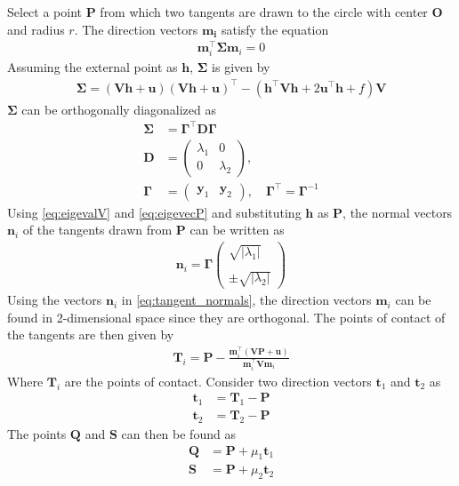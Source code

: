 \documentclass[journal,10pt,twocolumn]{article}
\providecommand{\abs}[1]{\left\vert#1\right\vert}
\let\vec\mathbf
\newcommand{\myvec}[1]{\ensuremath{\begin{pmatrix}#1\end{pmatrix}}}
\providecommand{\brak}[1]{\ensuremath{\left(#1\right)}}
\begin{document}
Select a point $\vec{P}$ from which two tangents are drawn to the circle with center $\vec{O}$ and radius $r$. The direction vectors $\vec{m_i}$ satisfy the equation
\begin{align}
	\vec{m}_i^\top\vec{\Sigma}\vec{m}_i = 0
\end{align}
Assuming the external point as $\vec{h}$, $\vec{\Sigma}$ is given by
\begin{align}
	\label{eq:Sigma}
	\vec{\Sigma} = \brak{\vec{Vh}+\vec{u}}\brak{\vec{Vh}+\vec{u}}^\top - \brak{\vec{h}^\top\vec{V}\vec{h} + 2\vec{u}^\top\vec{h} + f}\vec{V}
\end{align}
$\vec{\Sigma}$ can be orthogonally diagonalized as
\begin{align}
	\label{eq:Sigma_diag}
	\vec{\Sigma} &= \vec{\Gamma}^\top\vec{D}\vec{\Gamma}\\
	\label{eq:eigevalV}
	\vec{D} &= \myvec{\lambda_1 & 0\\ 0 & \lambda_2}, \\
	\label{eq:eigevecP}
	\vec{\Gamma} &= \myvec{\vec{y}_1 & \vec{y}_2}, \quad \vec{\Gamma}^{\top}=\vec{\Gamma}^{-1}
\end{align}
Using \eqref{eq:eigevalV} and \eqref{eq:eigevecP} and substituting $\vec{h}$ as $\vec{P}$, the normal vectors $\vec{n}_i$ of the tangents drawn from $\vec{P}$ can be written as
\begin{align}
	\label{eq:tangent_normals}
	\vec{n}_i = \vec{\Gamma}\myvec{\sqrt{\abs{\lambda_1}} \\\\ \pm\sqrt{\abs{\lambda_2}}}
\end{align}
Using the vectors $\vec{n}_i$ in \eqref{eq:tangent_normals}, the direction vectors $\vec{m}_i$ can be found in 2-dimensional space since they are orthogonal. The points of contact of the tangents are then given by
\begin{align}
	\vec{T}_i = \vec{P} - \frac{\vec{m}_i^\top\brak{\vec{VP}+\vec{u}}}{\vec{m}_i^\top\vec{V}\vec{m}_i}
\end{align}
Where $\vec{T}_i$ are the points of contact. Consider two direction vectors $\vec{t}_1$ and $\vec{t}_2$ as
\begin{align}
	\vec{t}_1 &= \vec{T}_1 - \vec{P}\\
	\vec{t}_2 &= \vec{T}_2 - \vec{P}
\end{align}
The points $\vec{Q}$ and $\vec{S}$ can then be found as
\begin{align}
	\label{eq:pt_Q}
	\vec{Q} &= \vec{P} + \mu_1\vec{t}_1\\ 
	\label{eq:pt_S}
	\vec{S} &= \vec{P} + \mu_2\vec{t}_2
\end{align}
\end{document}
